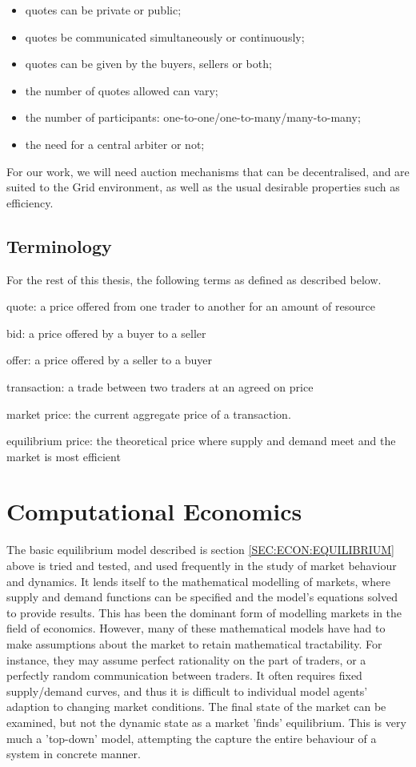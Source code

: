 \begin{itemize}
  \item quotes can be private or public;
  \item quotes be communicated simultaneously or continuously;
  \item quotes can be given by the buyers, sellers or both;
  \item the number of quotes allowed can vary;
  \item the number of participants: one-to-one/one-to-many/many-to-many;
  \item the need for a central arbiter or not;
\end{itemize}

For our work, we will need auction mechanisms that can be decentralised, and
are suited to the Grid environment, as well as the usual desirable properties
such as efficiency.


\subsection{Terminology}

For the rest of this thesis, the following terms as defined as described below.

quote: a price offered from one trader to another for an amount of resource

bid: a price offered by a buyer to a seller

offer: a price offered by a seller to a buyer

transaction: a trade between two traders at an agreed on price

market price: the current aggregate price of a transaction.

equilibrium price: the theoretical price where supply and demand meet and the
market is most efficient



\section{Computational Economics}
\label{SEC:ECON:COMP_TRADERS}

The basic equilibrium model described is section \ref{SEC:ECON:EQUILIBRIUM}
above is tried and tested, and used frequently in the study of market behaviour
and dynamics. It lends itself to the mathematical modelling of markets, where
supply and demand functions can be specified and the model's equations solved
to provide results. This has been the dominant form of modelling markets in the
field of economics. However, many of these mathematical models have had to make
assumptions about the market to retain mathematical tractability.  For
instance, they may assume perfect rationality on the part of traders, or a
perfectly random communication between traders.  It often requires fixed
supply/demand curves, and thus it is difficult to individual model agents'
adaption to changing market conditions. The final state of the market can be
examined, but not the dynamic state as a market 'finds' equilibrium.  This is
very much a 'top-down' model, attempting the capture the entire behaviour of a
system in concrete manner.

